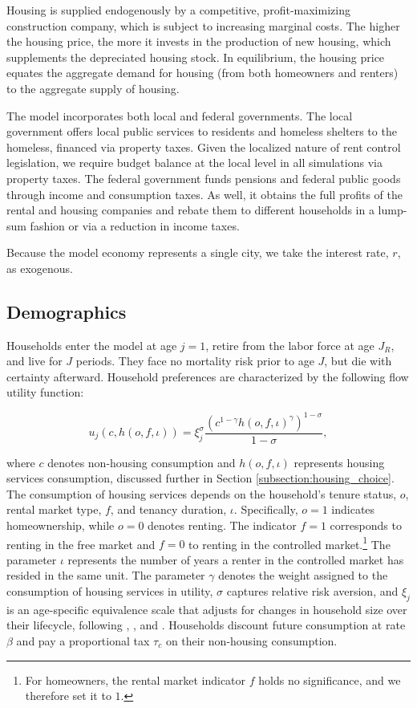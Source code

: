 \documentclass[parskip=full]{article}
\begin{document}
Housing is supplied endogenously by a competitive, profit-maximizing construction company, which is subject to increasing marginal costs. The higher the housing price, the more it invests in the production of new housing, which supplements the depreciated housing stock. In equilibrium, the housing price equates the aggregate demand for housing (from both homeowners and renters) to the aggregate supply of housing.

The model incorporates both local and federal governments. The local government offers local public services to residents and homeless shelters to the homeless, financed via property taxes. Given the localized nature of rent control legislation, we require budget balance at the local level in all simulations via property taxes. The federal government funds pensions and federal public goods through income and consumption taxes. As well, it obtains the full profits of the rental and housing companies and rebate them to different households in a lump-sum fashion or via a reduction in income taxes. 

Because the model economy represents a single city, we take the interest rate, $r$, as exogenous. 

\subsection{Demographics}\label{subsection:demographics}

Households enter the model at age $j=1$, retire from the labor force at age $J_{R}$, and live for $J$ periods. They face no mortality risk prior to age $J$, but die with certainty afterward. Household preferences are characterized by the following flow utility function:

\begin{equation*}
    u_{j}(c,h(o,f,\iota))=\xi_{j}^{\sigma}\frac{\left(c^{1-\gamma} h(o,f,\iota)^{\gamma}\right)^{1-\sigma}}{1-\sigma},
\end{equation*}

\noindent where $c$ denotes non-housing consumption and $h(o,f,\iota)$ represents housing services consumption, discussed further in Section \ref{subsection:housing_choice}. The consumption of housing services depends on the household's tenure status, $o$, rental market type, $f$, and tenancy duration, $\iota$. Specifically, $o=1$ indicates homeownership, while $o=0$ denotes renting. The indicator $f=1$ corresponds to renting in the free market and $f=0$ to renting in the controlled market.\footnote{For homeowners, the rental market indicator $f$ holds no significance, and we therefore set it to $1$.} The parameter $\iota$ represents the number of years a renter in the controlled market has resided in the same unit. The parameter $\gamma$ denotes the weight assigned to the consumption of housing services in utility, $\sigma$ captures relative risk aversion, and $\xi_{j}$ is an age-specific equivalence scale that adjusts for changes in household size over their lifecycle, following \citet{lm-1980}, \citet{wz-2010}, and \citet{xu-2013}. Households discount future consumption at rate $\beta$ and pay a proportional tax $\tau_{c}$ on their non-housing consumption.
\end{document}
